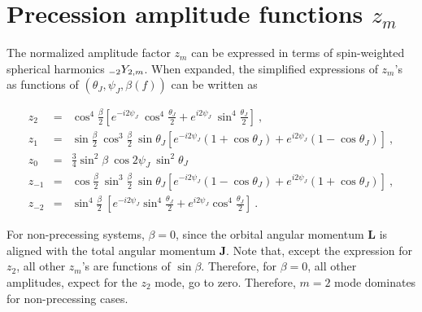 
\chapter{Precession amplitude functions $z_m$}

\label{append}
The normalized amplitude factor $z_m$ can be expressed in terms of 
spin-weighted spherical harmonics $\mathstrut_{-2}Y_{2,m}$. When expanded, the
simplified expressions of $z_m$'s  as functions of $(\theta_J,
\psi_J, \beta(f))$ can be written as

\begin{eqnarray}
z_2 &=& \cos^4 \frac{\beta}{2}\left[e^{-i2\psi_J}~\cos^4 \frac{\theta_J}{2}+e^{i2\psi_J}~\sin^4 \frac{\theta_J}{2} \right]~,\\
z_1 &=&\sin\frac{\beta}{2}~\cos^3\frac{\beta}{2}~\sin \theta_J \left[e^{-i2\psi_J} (1 +  \cos \theta_J) + e^{i2\psi_J} (1- \cos \theta_J)  \right]  ~,\\
z_0 &=& \frac{3}{4} \sin^2 \beta~\cos2 \psi_J~\sin^2 \theta_J~\\
z_{-1} &=& \cos\frac{\beta}{2}~\sin^3\frac{\beta}{2}~\sin \theta_J \left[e^{-i2\psi_J} (1 -  \cos \theta_J) + e^{i2\psi_J} (1+ \cos \theta_J)  \right]  ~,\\
z_{-2} &=& \sin^4\frac{\beta}{2}~\left[e^{-i2\psi_J} \sin^4\frac{\theta_J}{2} + e^{i2\psi_J} \cos^4\frac{\theta_J}{2} \right] ~.
\end{eqnarray}

For non-precessing systems, $\beta = 0$, since the orbital angular momentum
$\mathbf{L}$ is aligned with the total angular momentum $\mathbf{J}$. Note
that, except the expression for $z_2$, all other $z_m$'s are functions of
$\sin{\beta}$. Therefore, for $\beta = 0$, all other amplitudes, expect for
the $z_2$ mode, go to zero. Therefore, $m=2$ mode dominates for non-precessing
cases.
